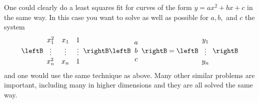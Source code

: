 One could clearly do a least squares fit for curves of the form $
y=ax^{2}+bx+c$ in the same way. In this case you want to solve as well as
possible for $a,b,$ and $c$ the system 
\begin{equation*}
\leftB
\begin{array}{ccc}
x_{1}^{2} & x_{1} & 1 \\ 
\vdots & \vdots & \vdots \\ 
x_{n}^{2} & x_{n} & 1
\end{array}
\rightB \leftB 
\begin{array}{c}
a \\ 
b \\ 
c
\end{array}
\rightB =\leftB 
\begin{array}{c}
y_{1} \\ 
\vdots \\ 
y_{n}
\end{array}
\rightB
\end{equation*}
and one would use the same technique as above. Many other similar problems
are important, including many in higher dimensions and they are all solved
the same way.
